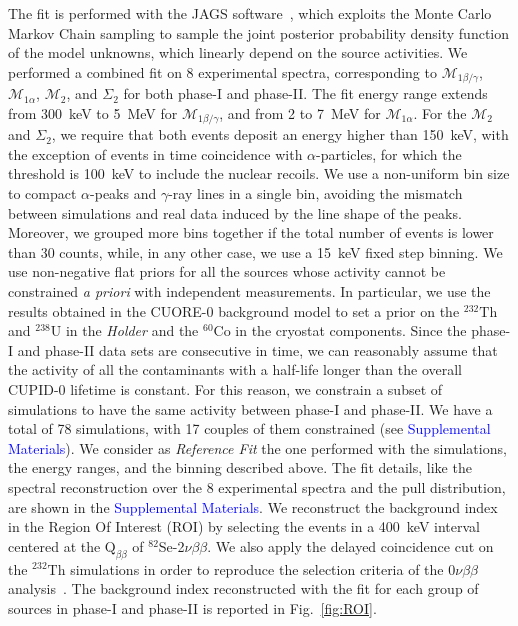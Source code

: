 \documentclass[%
reprint,
superscriptaddress,
altaffilletter,
showpacs,
showkeys,
amsmath, amssymb, aps,prl, floatfix
]{revtex4-1}
\newcommand{\se}{$^{82}$Se\xspace}
\newcommand{\onu}{$0\nu\beta \beta$\xspace}
\newcommand{\THO}{$^{232}\mathrm{Th}$\xspace}
\newcommand{\UR}{$^{238}\mathrm{U}$\xspace}
\newcommand{\QBB}{$\mathrm{Q}_{\beta\beta}$\xspace}
\newcommand{\vv}{2$\nu\beta\beta$\xspace}
\newcommand{\mspeconea}{$\mathcal{M}_{1\alpha}$\xspace}
\newcommand{\mspeconeb}{$\mathcal{M}_{1\beta/\gamma}$\xspace}
\newcommand{\mspectwo}{$\mathcal{M}_2$\xspace}
\newcommand{\summspectwo}{$\Sigma_2$\xspace}
\newcommand{\phone}{phase-I\xspace}
\newcommand{\phtwo}{phase-II\xspace}
\begin{document}
The fit is performed with the JAGS software~\cite{JAGS}, which exploits the Monte Carlo Markov Chain sampling to sample the joint posterior probability density function of the model unknowns, which linearly depend on the source activities.
We performed a combined fit on 8 experimental spectra, corresponding to \mspeconeb, \mspeconea, \mspectwo, and \summspectwo for both \phone and \phtwo. The fit energy range extends from 300~keV to 5~MeV for \mspeconeb, and from 2 to 7~MeV for \mspeconea. For the \mspectwo and \summspectwo, we require that both events deposit an energy higher than 150~keV, with the exception of events in time coincidence with $\alpha$-particles, for which the threshold is 100~keV to include the nuclear recoils. We use a non-uniform bin size to compact $\alpha$-peaks and $\gamma$-ray lines in a single bin, avoiding the mismatch between simulations and real data induced by the line shape of the peaks. Moreover, we grouped more bins together if the total number of events is lower than 30 counts, while, in any other case, we use a 15~keV fixed step binning. We use non-negative flat priors for all the sources whose activity cannot be constrained \textit{a priori} with independent measurements. In particular, we use the results obtained in the CUORE-0 background model to set a prior on the \THO and \UR in the \textit{Holder} and the $^{60}$Co in the cryostat components. Since the \phone and \phtwo data sets are consecutive in time, we can reasonably assume that the activity of all the contaminants with a half-life longer than the overall CUPID-0 lifetime is constant. For this reason, we constrain a subset of simulations to have the same activity between \phone and \phtwo.%
We have a total of 78 simulations, with 17 couples of them constrained (see \textcolor{blue}{Supplemental Materials}). 
We consider as \textit{Reference Fit} the one performed with the simulations, the energy ranges, and the binning described above. The fit details, like the spectral reconstruction over the 8 experimental spectra and the pull distribution, are shown in the \textcolor{blue}{Supplemental Materials}.
We reconstruct the background index in the Region Of Interest (ROI) by selecting the events in a 400~keV interval centered at the \QBB of \se-\vv.%
We also apply the delayed coincidence cut on the \THO simulations in order to reproduce the selection criteria of the \onu analysis~\cite{CUPID:2022puj,Azzolini:2019nmi}. 
The background index reconstructed with the fit for each group of sources in \phone and \phtwo is reported in Fig.~\ref{fig:ROI}. 
\end{document}
